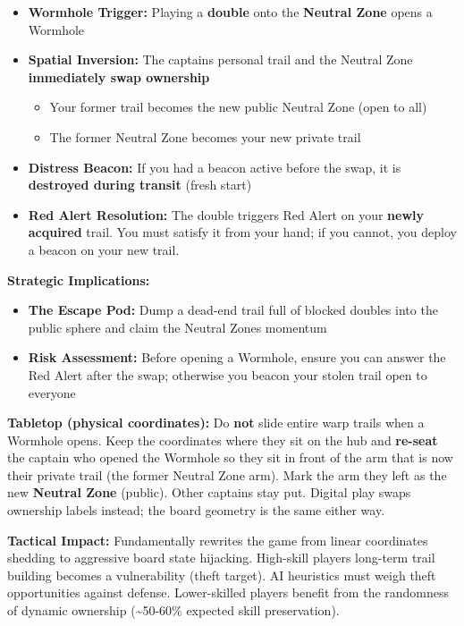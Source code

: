 \documentclass[11pt]{article}
\providecommand{\tightlist}{%
  \setlength{\itemsep}{0pt}\setlength{\parskip}{0pt}}
\begin{document}
\begin{itemize}
\tightlist
\item
  \textbf{Wormhole Trigger:} Playing a \textbf{double} onto the
  \textbf{Neutral Zone} opens a Wormhole
\item
  \textbf{Spatial Inversion:} The captain\textquotesingle s personal
  trail and the Neutral Zone \textbf{immediately swap ownership}
  \begin{itemize}
  \tightlist
  \item
    Your former trail becomes the new public Neutral Zone (open to all)
  \item
    The former Neutral Zone becomes your new private trail
  \end{itemize}
\item
  \textbf{Distress Beacon:} If you had a beacon active before the swap,
  it is \textbf{destroyed during transit} (fresh start)
\item
  \textbf{Red Alert Resolution:} The double triggers Red Alert on your
  \textbf{newly acquired} trail. You must satisfy it from your hand; if
  you cannot, you deploy a beacon on your new trail.
\end{itemize}

\textbf{Strategic Implications:}

\begin{itemize}
\tightlist
\item
  \textbf{The Escape Pod:} Dump a dead-end trail full of blocked
  doubles into the public sphere and claim the Neutral Zone\textquotesingle s
  momentum
\item
  \textbf{Risk Assessment:} Before opening a Wormhole, ensure you can
  answer the Red Alert after the swap; otherwise you beacon your stolen
  trail open to everyone
\end{itemize}

\textbf{Tabletop (physical coordinates):} Do \textbf{not} slide entire
warp trails when a Wormhole opens. Keep the coordinates where
they sit on the hub and \textbf{re-seat} the captain who opened the
Wormhole so they sit in front of the arm that is now their private
trail (the former Neutral Zone arm). Mark the arm they left as the new
\textbf{Neutral Zone} (public). Other captains stay put. Digital play
swaps ownership labels instead; the board geometry is the same either
way.

\textbf{Tactical Impact:} Fundamentally rewrites the game from linear
coordinates shedding to aggressive board state hijacking. High-skill
players\textquotesingle{} long-term trail building becomes a
vulnerability (theft target). AI heuristics must weigh theft
opportunities against defense. Lower-skilled players benefit from the
randomness of dynamic ownership (\textasciitilde50-60\% expected skill
preservation).
\end{document}
